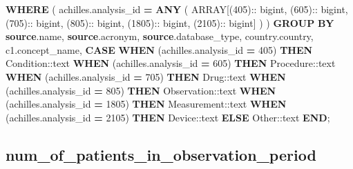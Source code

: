 \documentclass[
]{book}
\newenvironment{Shaded}{\begin{snugshade}}{\end{snugshade}}
\newcommand{\CharTok}[1]{\textcolor[rgb]{0.31,0.60,0.02}{#1}}
\newcommand{\ControlFlowTok}[1]{\textcolor[rgb]{0.13,0.29,0.53}{\textbf{#1}}}
\newcommand{\DataTypeTok}[1]{\textcolor[rgb]{0.13,0.29,0.53}{#1}}
\newcommand{\DecValTok}[1]{\textcolor[rgb]{0.00,0.00,0.81}{#1}}
\newcommand{\KeywordTok}[1]{\textcolor[rgb]{0.13,0.29,0.53}{\textbf{#1}}}
\newcommand{\NormalTok}[1]{#1}
\newcommand{\OperatorTok}[1]{\textcolor[rgb]{0.81,0.36,0.00}{\textbf{#1}}}
\newcommand{\StringTok}[1]{\textcolor[rgb]{0.31,0.60,0.02}{#1}}
\begin{document}
\begin{Shaded}
\begin{Highlighting}[]
 \KeywordTok{WHERE}
\NormalTok{   (}
\NormalTok{     achilles.analysis\_id }\OperatorTok{=} \KeywordTok{ANY}\NormalTok{ (}
       \DataTypeTok{ARRAY}\NormalTok{[(}\DecValTok{405}\NormalTok{):: bigint,}
\NormalTok{       (}\DecValTok{605}\NormalTok{):: bigint,}
\NormalTok{       (}\DecValTok{705}\NormalTok{):: bigint,}
\NormalTok{       (}\DecValTok{805}\NormalTok{):: bigint,}
\NormalTok{       (}\DecValTok{1805}\NormalTok{):: bigint,}
\NormalTok{       (}\DecValTok{2105}\NormalTok{):: bigint]}
\NormalTok{     )}
\NormalTok{   )}
 \KeywordTok{GROUP} \KeywordTok{BY}
   \KeywordTok{source}\NormalTok{.name,}
   \KeywordTok{source}\NormalTok{.acronym,}
   \KeywordTok{source}\NormalTok{.database\_type,}
\NormalTok{   country.country,}
\NormalTok{   c1.concept\_name,}
       \ControlFlowTok{CASE}
           \ControlFlowTok{WHEN}\NormalTok{ (achilles.analysis\_id }\OperatorTok{=} \DecValTok{405}\NormalTok{)}
             \ControlFlowTok{THEN} \StringTok{\textquotesingle{}Condition\textquotesingle{}}\NormalTok{:}\CharTok{:text}
           \ControlFlowTok{WHEN}\NormalTok{ (achilles.analysis\_id }\OperatorTok{=} \DecValTok{605}\NormalTok{)}
             \ControlFlowTok{THEN} \StringTok{\textquotesingle{}Procedure\textquotesingle{}}\NormalTok{:}\CharTok{:text}
           \ControlFlowTok{WHEN}\NormalTok{ (achilles.analysis\_id }\OperatorTok{=} \DecValTok{705}\NormalTok{)}
             \ControlFlowTok{THEN} \StringTok{\textquotesingle{}Drug\textquotesingle{}}\NormalTok{:}\CharTok{:text}
           \ControlFlowTok{WHEN}\NormalTok{ (achilles.analysis\_id }\OperatorTok{=} \DecValTok{805}\NormalTok{)}
             \ControlFlowTok{THEN} \StringTok{\textquotesingle{}Observation\textquotesingle{}}\NormalTok{:}\CharTok{:text}
           \ControlFlowTok{WHEN}\NormalTok{ (achilles.analysis\_id }\OperatorTok{=} \DecValTok{1805}\NormalTok{)}
             \ControlFlowTok{THEN} \StringTok{\textquotesingle{}Measurement\textquotesingle{}}\NormalTok{:}\CharTok{:text}
           \ControlFlowTok{WHEN}\NormalTok{ (achilles.analysis\_id }\OperatorTok{=} \DecValTok{2105}\NormalTok{)}
             \ControlFlowTok{THEN} \StringTok{\textquotesingle{}Device\textquotesingle{}}\NormalTok{:}\CharTok{:text}
           \ControlFlowTok{ELSE} \StringTok{\textquotesingle{}Other\textquotesingle{}}\NormalTok{:}\CharTok{:text}
       \ControlFlowTok{END}\NormalTok{;}
\end{Highlighting}
\end{Shaded}

\hypertarget{num_of_patients_in_observation_period}{%
\subsection*{num\_of\_patients\_in\_observation\_period}\label{num_of_patients_in_observation_period}}
\end{document}
